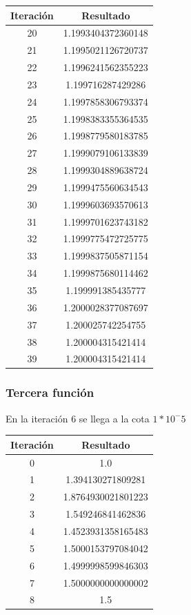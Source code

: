 \documentclass[titlepage,a4paper]{article}
\begin{document}
\begin{multicols}{2}
\begin{center}
\begin{tabular}{| c | c |}
                \hline
        \end{tabular}
    \end{center}
    \begin{center}
        \begin{tabular}{| c | c |}
        \hline
         Iteración & Resultado \\ \hline
20     &  1.1993404372360148 \\
21     &  1.1995021126720737 \\
22     &  1.1996241562355223 \\
23     &  1.199716287429286 \\
24     &  1.1997858306793374 \\
25     &  1.1998383355364535 \\
26     &  1.1998779580183785 \\
27     &  1.1999079106133839 \\
28     &  1.1999304889638724 \\
29     &  1.1999475560634543 \\
30     &  1.1999603693570613 \\
31     &  1.1999701623743182 \\
32     &  1.1999775472725775 \\
33     &  1.1999837505871154 \\
34     &  1.1999875680114462 \\
35     &  1.199991385435777 \\
36     &  1.2000028377087697 \\
37     &  1.200025742254755 \\
38     &  1.200004315421414 \\
39     &  1.200004315421414 \\
        \hline
        \end{tabular}
    \end{center}
\end{multicols}

\subsubsection{Tercera función}\label{sec:sec3}
En la iteración 6 se llega a la cota $1*10^-5$
\begin{center}
\begin{tabular}{| c | c |}
    \hline
     Iteración & Resultado \\ \hline
  0     &  1.0 \\
1     &  1.394130271809281 \\
2     &  1.8764930021801223 \\
3     &  1.549246841462836 \\
4     &  1.4523931358165483 \\
5     &  1.5000153797084042 \\
6     &  1.4999998599846303 \\
7     &  1.5000000000000002 \\
8     &  1.5 \\
    \hline
    \end{tabular}
\end{center}
\end{document}
